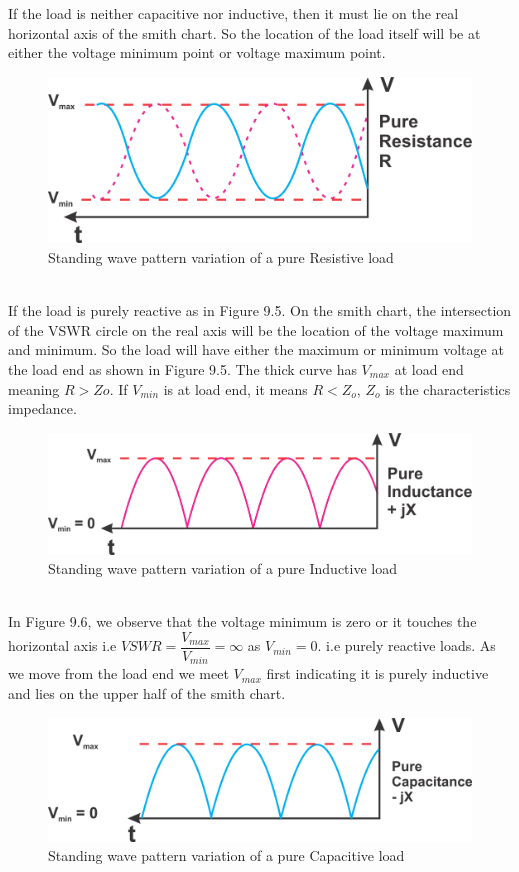 If the load is neither capacitive nor inductive, then it must lie on the real horizontal axis of the smith chart. So the location of the load itself will be at either the voltage minimum point or voltage maximum point.\\
\begin{figure}[h!]
\centering
\includegraphics[scale=0.5]{./graphics/Group95}
\caption{Standing wave pattern variation of a pure Resistive load}
\end{figure}\\
If the load is purely reactive as in Figure 9.5. On the smith chart, the intersection of the VSWR circle on the real axis will be the location of the voltage maximum and minimum. So the load will have either the maximum or minimum voltage at the load end as shown in Figure 9.5. The thick curve has ${V_{max}}$ at load end meaning ${R>Zo}$. If ${V_{min}}$ is at load end, it means ${R<Z_o}$, ${Z_o}$ is the characteristics impedance.\\
\begin{figure}[h!]
\centering
\includegraphics[scale=0.5]{./graphics/Group96}
\caption{Standing wave pattern variation of a pure Inductive load}
\end{figure}\\
In Figure 9.6, we observe that the voltage minimum is zero or it touches the horizontal axis i.e ${VSWR=\dfrac{V_{max}}{V_{min}}=\infty}$ as ${V_{min}=0}$. i.e purely reactive loads. As we move from the load end we meet ${V_{max}}$ first indicating it is purely inductive and lies on the upper half of the smith chart.\\
\begin{figure}[h!]
\centering
\includegraphics[scale=0.5]{./graphics/Group97}
\caption{Standing wave pattern variation of a pure Capacitive load}
\end{figure}\\
